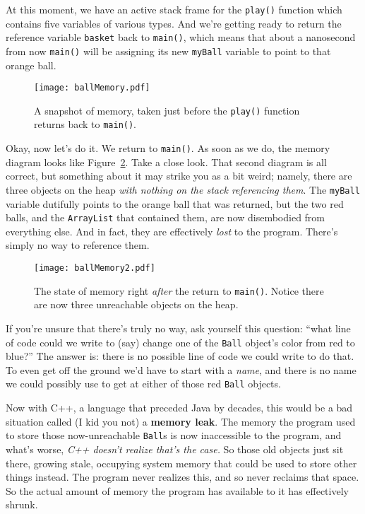 At this moment, we have an active stack frame for the \texttt{play()} function
which contains five variables of various types. And we're getting ready to
return the reference variable \texttt{basket} back to \texttt{main()}, which
means that about a nanosecond from now \texttt{main()} will be assigning its
new \texttt{myBall} variable to point to that orange ball.

\begin{figure}[ht]
\centering
\texttt{[image: ballMemory.pdf]}    %
\caption{A snapshot of memory, taken just before the \texttt{play()} function
returns back to \texttt{main()}.}
\label{fig:ballMemory}
\end{figure}

Okay, now let's do it. We return to \texttt{main()}. As soon as we do, the
memory diagram looks like Figure~\ref{fig:ballMemory2}. Take a close look.
That second diagram is all correct, but something about it may strike you as a
bit weird; namely, there are three objects on the heap \textit{with nothing on
the stack referencing them}. The \texttt{myBall} variable dutifully points to
the orange ball that was returned, but the two red balls, and the
\texttt{ArrayList} that contained them, are now disembodied from everything
else. And in fact, they are effectively \textit{lost} to the program. There's
simply no way to reference them. 

\begin{figure}[ht]
\centering
\texttt{[image: ballMemory2.pdf]}    %
\caption{The state of memory right \textit{after} the return to
\texttt{main()}. Notice there are now three unreachable objects on the heap.}
\label{fig:ballMemory2}
\end{figure}

If you're unsure that there's truly no way, ask yourself this question: ``what
line of code could we write to (say) change one of the \texttt{Ball} object's
color from red to blue?'' The answer is: there is no possible line of code we
could write to do that. To even get off the ground we'd have to start with a
\textit{name}, and there is no name we could possibly use to get at either of
those red \texttt{Ball} objects.

Now with C++, a language that preceded Java by decades, this would be a bad
situation called (I kid you not) a \textbf{memory leak}. The memory the
program used to store those now-unreachable \texttt{Ball}s is now inaccessible
to the program, and what's worse, \textit{C++ doesn't realize that's the
case.} So those old objects just sit there, growing stale, occupying system
memory that could be used to store other things instead. The program never
realizes this, and so never reclaims that space. So the actual amount of
memory the program has available to it has effectively shrunk.

